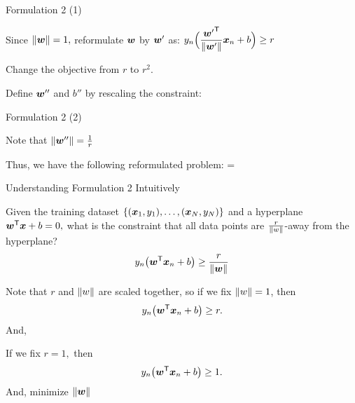 \documentclass[handout,fleqn,aspectratio=169]{beamer}
\begin{document}
\begin{frame}{Formulation 2 (1)}

\mycolorbox
{
}
\plitemsep 0.07in
\bci

\item Since $\left \lVert \bm{w} \right \rVert=1,$ reformulate $\bm{w}$ by $\bm{w}'$ as: 
$y_n \Big(\dfrac{{\bm{w}'}^{\mathsf{T}}}{\left \lVert \bm{w}' \right \rVert}\bm{x}_n +b \Big) \geq r$
\item Change the objective from $r$ to $r^2.$
\item Define $\bm{w}''$ and $b''$ by rescaling the constraint:
\eci
\end{frame}

\begin{frame}{Formulation 2 (2)}

\plitemsep 0.07in
\bci

\item Note that $\left \lVert \bm{w}'' \right \rVert = \frac{1}{r}$
\item Thus, we have the following reformulated problem:
\mycolorbox
{
\vspace{-0.3cm}
}
=

\mycolorbox
{
\vspace{-0.3cm}
}


\eci
\end{frame}

\begin{frame}{Understanding Formulation 2 Intuitively}

\plitemsep 0.07in
\bci

\item Given the training dataset $\{(\bm{x}_1,y_1), \ldots, (\bm{x}_N,y_N) \}$ 
and a hyperplane ${\bm{w}}^{\mathsf{T}}\bm{x} + b =0,$ what is the constraint that all data points are $\frac{r}{\left \lVert w \right \rVert}$-away from the hyperplane?
$$
y_n \big({\bm{w}}^{\mathsf{T}}\bm{x}_n +b \big) \geq \frac{r}{\left \lVert \bm{w} \right \rVert}
$$

\item {} Note that $r$ and $\left \lVert w \right \rVert$ are scaled together, so if we fix $\left \lVert w \right \rVert=1$, then 
$$
y_n \big({\bm{w}}^{\mathsf{T}}\bm{x}_n +b \big) \geq r.
$$
And, 

\item {} If we fix $r=1,$ then  
$$
y_n \big({\bm{w}}^{\mathsf{T}}\bm{x}_n +b \big) \geq 1.
$$
And, minimize $\left \lVert \bm{w} \right \rVert$
\eci
\end{frame}
\end{document}
